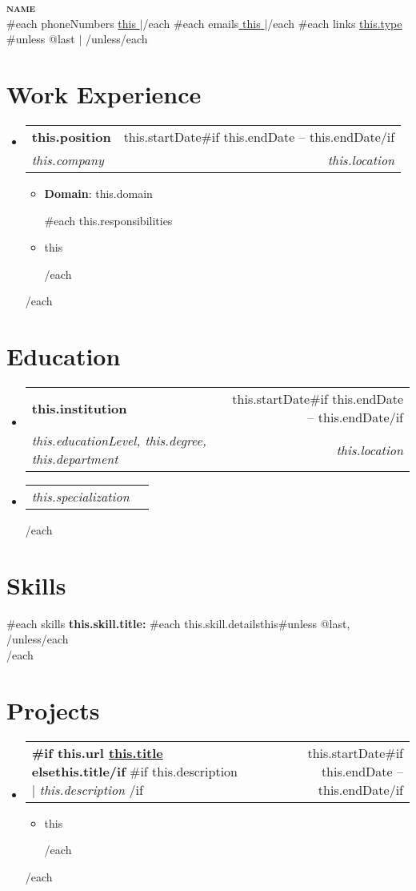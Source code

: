 \documentclass[letterpaper,11pt]{article}
\makeatletter
\newcommand{\resumeItem}[1]{
  \item\small{
    {#1 \vspace{-2pt}}
  }
}
\newcommand{\resumeSubheading}[4]{
  \vspace{-2pt}\item
    \begin{tabular*}{0.97\textwidth}[t]{l@{\extracolsep{\fill}}r}
      \textbf{#1} & #2 \\
      \textit{\small#3} & \textit{\small #4} \\
    \end{tabular*}\vspace{-7pt}
}
\newcommand{\resumeSubSubheading}[2]{
    \item
    \begin{tabular*}{0.97\textwidth}{l@{\extracolsep{\fill}}r}
      \textit{\small#1} & \textit{\small #2} \\
    \end{tabular*}\vspace{-7pt}
}
\newcommand{\resumeProjectHeading}[2]{
    \item
    \begin{tabular*}{0.97\textwidth}{l@{\extracolsep{\fill}}r}
      \small#1 & #2 \\
    \end{tabular*}\vspace{-7pt}
}
\newcommand{\resumeSubHeadingListStart}{\begin{itemize}[leftmargin=0.15in, label={}]}
\newcommand{\resumeSubHeadingListEnd}{\end{itemize}}
\newcommand{\resumeItemListStart}{\begin{itemize}}
\newcommand{\resumeItemListEnd}{\end{itemize}\vspace{-5pt}}
\makeatother
\begin{document}
\begin{center}
    \textbf{\Huge\scshape {{name}} } \\ \vspace{1pt}
    {{#each phoneNumbers}} \small{\underline{ {{this}} }} $|${{/each}}
    {{#each emails}}\small{\underline{ {{this}} }}$|${{/each}}
    {{#each links}} \small{\href{ {{this.url}} }{\underline{ {{this.type}} }}}{{#unless @last}} $|$ {{/unless}}{{/each}}
\end{center}

\section{Work Experience}
  \resumeSubHeadingListStart
  {{#each workExperiences}}
    \resumeSubheading
    { {{this.position}} }{ {{this.startDate}}{{#if this.endDate}} -- {{this.endDate}}{{/if}} }
        { {{this.company}} }{ {{this.location}} }
        \resumeItemListStart
          \resumeItem{\textbf{Domain}: {{this.domain}} }
          {{#each this.responsibilities}}
          \resumeItem{ {{this}} }
          {{/each}}
        \resumeItemListEnd
  {{/each}}
  \resumeSubHeadingListEnd

\section{Education}
  \resumeSubHeadingListStart
  {{#each educations}}
    \resumeSubheading
    { {{this.institution}} } { {{this.startDate}}{{#if this.endDate}} -- {{this.endDate}}{{/if}} }
        { {{this.educationLevel}}, {{this.degree}}, {{this.department}} }{ {{this.location}} }
        \resumeSubSubheading
          { {{this.specialization}} }
          {}
  {{/each}}
  \resumeSubHeadingListEnd

\section{Skills}
 \begin{itemize}[leftmargin=0.15in, label={}]
    \small{\item{
      {{#each skills}}
        \textbf{ {{this.skill.title}}: }{ {{#each this.skill.details}}{{this}}{{#unless @last}}, {{/unless}}{{/each}} } \\
      {{/each}}
    }}
 \end{itemize}

\section{Projects}
    \resumeSubHeadingListStart
    {{#each projects}}
      \resumeProjectHeading
        { \textbf{ {{#if this.url}} \href{ {{this.url}} }{ {{this.title}} } {{else}}{{this.title}}{{/if}} }{{#if this.description}}$|$\emph{ {{this.description}} } {{/if}} }{ {{this.startDate}}{{#if this.endDate}} -- {{this.endDate}}{{/if}} }
          \resumeItemListStart
            {{#each this.responsibilities}}
              \resumeItem{ {{this}} }
            {{/each}}
          \resumeItemListEnd
    {{/each}}
    \resumeSubHeadingListEnd
\end{document}
